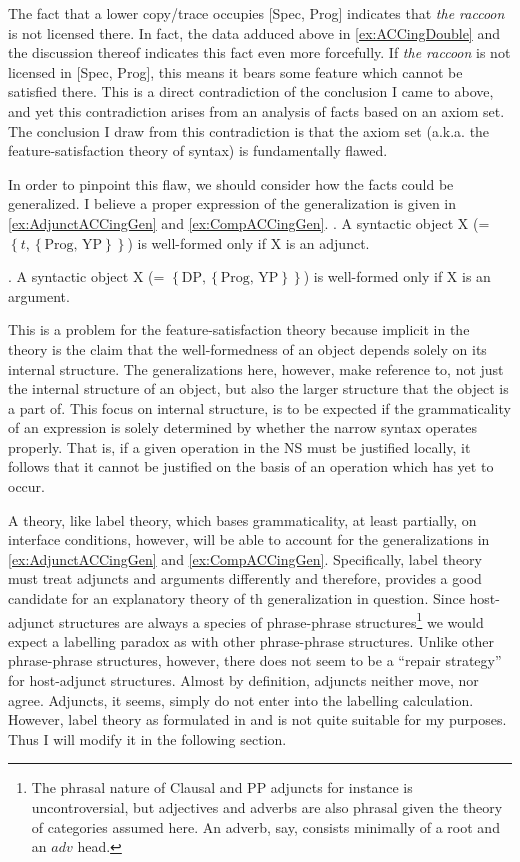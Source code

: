 \documentclass[MilwayThesis]{subfiles}
\begin{document}
The fact that a lower copy/trace occupies [Spec, Prog] indicates that \textit{the raccoon} is not licensed there.
In fact, the data adduced above in \cref{ex:ACCingDouble} and the discussion thereof indicates this fact even more forcefully.
If \textit{the raccoon} is not licensed in [Spec, Prog], this means it bears some feature which cannot be satisfied there.
This is a direct contradiction of the conclusion I came to above, and yet this contradiction arises from an analysis of facts based on an axiom set.
The conclusion I draw from this contradiction is that the axiom set (a.k.a. the feature-satisfaction theory of syntax) is fundamentally flawed.

In order to pinpoint this flaw, we should consider how the facts could be generalized.
I believe a proper expression of the generalization is given in \cref{ex:AdjunctACCingGen} and \cref{ex:CompACCingGen}.
\ex. A syntactic object X (= $\left\{ t, \left\{ \text{Prog, YP}  \right\} \right\}$) is well-formed only if X is an adjunct.\label{ex:AdjunctACCingGen}

\ex. A syntactic object X (= $\left\{ \text{DP}, \left\{ \text{Prog, YP}  \right\} \right\}$) is well-formed only if X is an argument.\label{ex:CompACCingGen}

This is a problem for the feature-satisfaction theory because implicit in the theory is the claim that the well-formedness of an object depends solely on its internal structure.
The generalizations here, however, make reference to, not just the internal structure of an object, but also the larger structure that the object is a part of.
This focus on internal structure, is to be expected if the grammaticality of an expression is solely determined by whether the narrow syntax operates properly.
That is, if a given operation in the NS must be justified locally, it follows that it cannot be justified on the basis of an operation which has yet to occur.

A theory, like label theory, which bases grammaticality, at least partially, on interface conditions, however, will be able to account for the generalizations in \cref{ex:AdjunctACCingGen} and \cref{ex:CompACCingGen}.
Specifically, label theory must treat adjuncts and arguments differently and therefore, provides a good candidate for an explanatory theory of th generalization in question.
Since host-adjunct structures are always a species of phrase-phrase structures\footnote{
	The phrasal nature of Clausal and PP adjuncts for instance is uncontroversial, but adjectives and adverbs are also phrasal given the theory of categories assumed here.
	An adverb, say, consists minimally of a root and an $adv$ head.
}
we would expect a labelling paradox as with other phrase-phrase structures.
Unlike other phrase-phrase structures, however, there does not seem to be a ``repair strategy'' for host-adjunct structures.
Almost by definition, adjuncts neither move, nor agree. 
Adjuncts, it seems, simply do not enter into the labelling calculation.
However, label theory as formulated in \cite{chomsky2013problems} and \cite{chomsky2015problems} is not quite suitable for my purposes.
Thus I will modify it in the following section.
\end{document}
